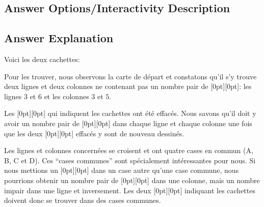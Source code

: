 \documentclass[a4paper,11pt]{report}
\newcommand{\taskGraphicsFolder}{..}
\begin{document}
\subsection*{Answer Options/Interactivity Description}



\endgroup

\subsection*{Answer Explanation}

Voici les deux cachettes:

{\centering%
\par}

Pour les trouver, nous observons la carte de départ et constatons qu’il s’y trouve deux lignes et deux colonnes ne contenant pas un nombre pair de \raisebox{\dimexpr -0.5ex +0.3ex \relax}[0pt][0pt]{}: les lignes $3$ et $6$ et les colonnes $3$ et $5$.

{\centering%
\par}

Les \raisebox{\dimexpr -0.5ex +0.3ex \relax}[0pt][0pt]{} qui indiquent les cachettes ont été effacés. Nous savons qu’il doit y avoir un nombre pair de \raisebox{\dimexpr -0.5ex +0.3ex \relax}[0pt][0pt]{} dans chaque ligne et chaque colonne une fois que les deux \raisebox{\dimexpr -0.5ex +0.3ex \relax}[0pt][0pt]{} effacés y sont de nouveau dessinés.

Les lignes et colonnes concernées se croisent et ont quatre cases en commun (A, B, C et D). Ces “cases communes” sont spécialement intéressantes pour nous. Si nous mettions un \raisebox{\dimexpr -0.5ex +0.3ex \relax}[0pt][0pt]{} dans un case autre qu’une case commune, nous pourrions obtenir un nombre pair de \raisebox{\dimexpr -0.5ex +0.3ex \relax}[0pt][0pt]{} dans une colonne, mais un nombre impair dans une ligne et inversement. Les deux \raisebox{\dimexpr -0.5ex +0.3ex \relax}[0pt][0pt]{} indiquant les cachettes doivent donc se trouver dans des cases communes.
\end{document}
